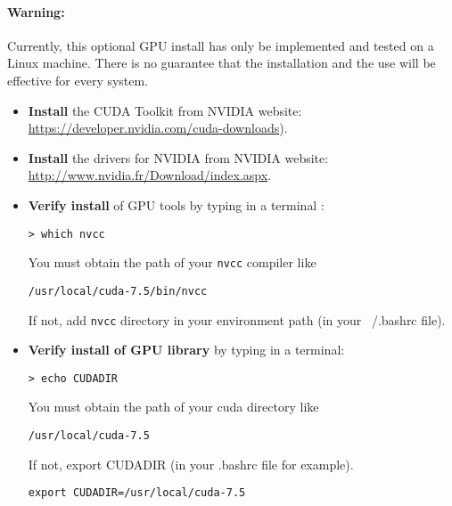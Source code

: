 \paragraph{Warning:} Currently, this optional GPU install has only be implemented and tested on a Linux machine. There is no guarantee that the installation and the use will be effective for every system.

\begin{itemize}
\item \textbf{Install} the CUDA Toolkit from NVIDIA website:\\
\url{https://developer.nvidia.com/cuda-downloads}).
\item \textbf{Install} the drivers for NVIDIA from NVIDIA website:\\ \url{http://www.nvidia.fr/Download/index.aspx}.
\item \textbf{Verify install} of GPU tools by typing in a terminal :
\lstset{style=customBash} 
\begin{lstlisting}
> which nvcc
\end{lstlisting}
You must obtain the path of your \texttt{nvcc} compiler like 
\begin{lstlisting}
/usr/local/cuda-7.5/bin/nvcc
\end{lstlisting}
If not, add \texttt{nvcc} directory in your environment path (in your ~/.bashrc file).

\item \textbf{Verify install of GPU library} by typing in a terminal: 
\begin{lstlisting}
> echo CUDADIR
\end{lstlisting}
You must obtain the path of your cuda directory like
\begin{lstlisting}
/usr/local/cuda-7.5
\end{lstlisting}
If not, export CUDADIR (in your .bashrc file for example).
\begin{lstlisting}
export CUDADIR=/usr/local/cuda-7.5
\end{lstlisting}

		
	   
\end{itemize}

